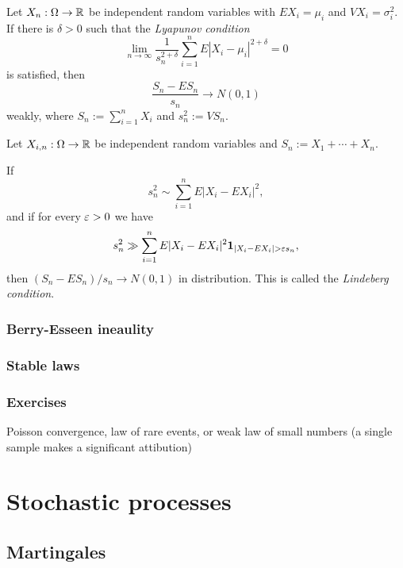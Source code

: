 \documentclass{../note}
\begin{document}
\begin{prb}
Let $X_n:\Omega\to\mathbb{R}$ be independent random variables with $EX_i=\mu_i$ and $VX_i=\sigma_i^2$.
If there is $\delta>0$ such that the \emph{Lyapunov condition}
\[\lim_{n\to\infty}\frac1{s_n^{2+\delta}}\sum_{i=1}^nE|X_i-\mu_i|^{2+\delta}=0\]
is satisfied, then
\[\frac{S_n-ES_n}{s_n}\to N(0,1)\]
weakly, where $S_n:=\sum_{i=1}^nX_i$ and $s_n^2:=VS_n$.
\end{prb}

\begin{prb}
Let $X_{i,n}:\Omega\to\mathbb{R}$ be independent random variables and $S_n:=X_1+\cdots+X_n$.
\begin{parts}
\item
If
\[s_n^2\sim\sum_{i=1}^nE|X_i-EX_i|^2,\]
and if for every $\varepsilon>0$ we have
\[s_n^2\gg\sum_{i=1}^nE|X_i-EX_i|^2\1_{|X_i-EX_i|>\e s_n},\]
then $(S_n-ES_n)/s_n\to N(0,1)$ in distribution.
This is called the \emph{Lindeberg condition}.
\item

\end{parts}
\end{prb}


\section{Berry-Esseen ineaulity}



\section{Stable laws}


\section*{Exercises}

Poisson convergence, law of rare events, or weak law of small numbers (a single sample makes a significant attibution)














\part{Stochastic processes}
\chapter{Martingales}
\end{document}

